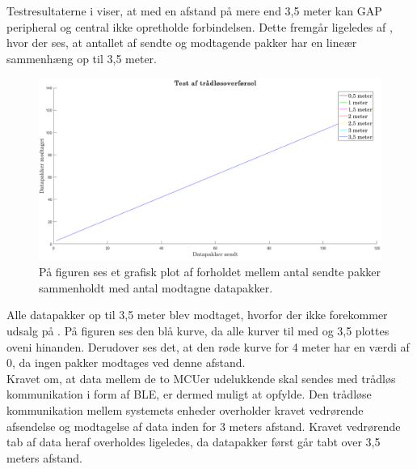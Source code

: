 Testresultaterne i  viser, at med en afstand på mere end 3,5 meter kan GAP peripheral og central ikke opretholde forbindelsen. Dette fremgår ligeledes af , hvor der ses, at antallet af sendte og modtagende pakker har en lineær sammenhæng op til 3,5 meter.
\begin{figure}[H]
	\centering
	\includegraphics[scale=0.35]{figures/cDesign/test_ble.png}
	\caption{På figuren ses et grafisk plot af forholdet mellem antal sendte pakker sammenholdt med antal modtagne datapakker. }
	\label{fig:test_ble}
\end{figure}\vspace{-.25cm}
Alle datapakker op til 3,5 meter blev modtaget, hvorfor der ikke forekommer udsalg på . På figuren ses den blå kurve, da alle kurver til med og 3,5 plottes oveni hinanden. Derudover ses det, at den røde kurve for 4 meter har en værdi af 0, da ingen pakker modtages ved denne afstand. \\
Kravet om, at data mellem de to MCUer udelukkende skal sendes med trådløs kommunikation i form af BLE, er dermed muligt at opfylde. Den trådløse kommunikation mellem systemets enheder overholder kravet vedrørende afsendelse og modtagelse af data inden for 3 meters afstand. Kravet vedrørende tab af data heraf overholdes ligeledes, da datapakker først går tabt over 3,5 meters afstand.
